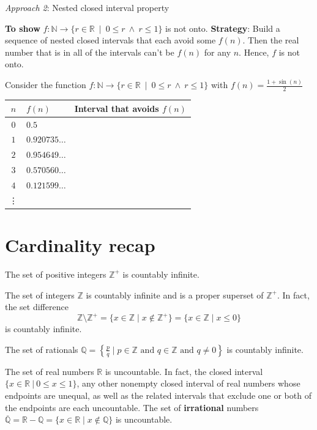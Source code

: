 \documentclass[12pt, oneside]{article}
\begin{document}
{\it Approach 2}: Nested closed interval property

{\bf To show} $f: \mathbb{N} \to \{  r \in \mathbb{R} ~\mid~ 0  \leq r ~\wedge~ r \leq 1 \}$ is not onto. 
{\bf  Strategy}: Build
a sequence of nested closed intervals that each avoid some $f(n)$.   Then  the real
number that is in all of the intervals  can't be $f(n)$ for any $n$. Hence,  $f$ is not  onto.

Consider the function $f: \mathbb{N} \to \{  r \in \mathbb{R} ~\mid~ 0 \leq r ~\wedge~ r \leq 1 \}$ with  $f(n) = \frac{1+\sin(n)}{2}$

\begin{center}
\begin{tabular}{c||p{1.65in} || p{3in} }
$n$ &  $f(n)$& Interval that avoids $f(n)$ \\
\hline
$0$ & $0.5$ &  \\
$1$ &$0.920735\ldots$  &  \\
$2$ &$0.954649\ldots$ &  \\
$3$ &$0.570560\ldots$ & \\
$4$ &$0.121599\ldots $&  \\
\vdots &  &\\
\end{tabular}
\end{center}
  \vfill
\section*{Cardinality recap}



The set of positive integers $\mathbb{Z}^{+}$ is countably infinite.

The set of integers $\mathbb{Z}$ is countably infinite and is a proper superset of $\mathbb{Z}^{+}$. 
In fact, the set difference 
$$\mathbb{Z} \setminus \mathbb{Z}^{+} = \{ x \in \mathbb{Z} \mid x \notin \mathbb{Z}^+\} 
= \{ x \in \mathbb{Z} \mid x \leq 0 \}$$ is countably infinite.

The set of rationals 
$\mathbb{Q} = \left\{ \frac{p}{q} \mid p \in \mathbb{Z}  \text{ and  } 
q  \in \mathbb{Z} \text{ and } q \neq  0 \right\}$ is countably infinite.


The set of real numbers $\mathbb{R}$ is uncountable. In fact, the closed 
interval $\{x \in \mathbb{R} ~|~ 0 \leq x \leq 1\}$, 
any other nonempty closed interval of real numbers whose endpoints are 
unequal, as well as the related intervals that exclude one or both of the endpoints are
each uncountable.
The set of {\bf irrational} numbers $\overline{\mathbb{Q}} = \mathbb{R} - \mathbb{Q}
= \{ x \in \mathbb{R} \mid x \notin \mathbb{Q} \}$ is uncountable.
\end{document}
